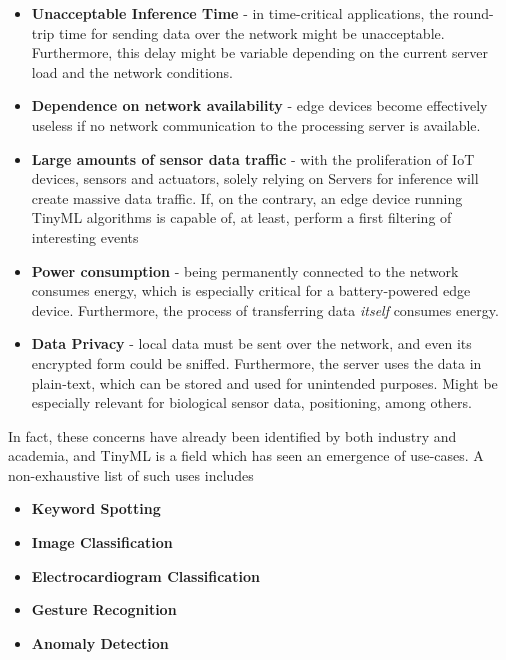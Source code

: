 \begin{itemize}
  \item \textbf{Unacceptable Inference Time} - in time-critical applications, the round-trip time for sending data over the network might be unacceptable. Furthermore, this delay might be variable depending on the current server load and the network conditions.
  \item \textbf{Dependence on network availability} - edge devices become effectively useless if no network communication to the processing server is available.
  \item \textbf{Large amounts of sensor data traffic} - with the proliferation of IoT devices, sensors and actuators, solely relying on Servers for inference will create massive data traffic. If, on the contrary, an edge device running TinyML algorithms is capable of, at least, perform a first filtering of interesting events
  \item \textbf{Power consumption} - being permanently connected to the network consumes energy, which is especially critical for a battery-powered edge device. Furthermore, the process of transferring data \textit{itself} consumes energy.
  \item \textbf{Data Privacy} - local data must be sent over the network, and even its encrypted form could be sniffed. Furthermore, the server uses the data in plain-text, which can be stored and used for unintended purposes. Might be especially relevant for biological sensor data, positioning, among others.
\end{itemize}

In fact, these concerns have already been identified by both industry and academia, and TinyML is a field which has seen an emergence of use-cases. A non-exhaustive list of such uses includes

\begin{itemize}
  \item \textbf{Keyword Spotting}
  \item \textbf{Image Classification}
  \item \textbf{Electrocardiogram Classification}
  \item \textbf{Gesture Recognition}
  \item \textbf{Anomaly Detection}
\end{itemize}


